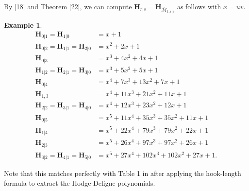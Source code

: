 \documentclass[11pt]{amsart}
\numberwithin{equation}{section}
\theoremstyle{definition}
\newtheorem{exam}[theo]{Example}
\newcommand{\bH}{\mathbf{H}}
\def\cM{{\mathcal M}}
\def\bcM{\overline{\cM}}
\begin{document}
By \eqref{18} and Theorem \ref{22}, we can compute $\bH_{r|s}=\bH_{\bcM_{1,r|s}}$ as follows with $x=uv$. 
\begin{exam}\label{23}
\begin{align*}
\bH_{0|1} = \bH_{1|0} &= x + 1 \\
\bH_{0|2} = \bH_{1|1} = \bH_{2|0} &= x^2 + 2x + 1 \\
\bH_{0|3} &= x^3 + 4x^2 + 4x + 1 \\
\bH_{1|2} = \bH_{2|1} = \bH_{3|0} &= x^3 + 5x^2 + 5x + 1 \\
\bH_{0|4} &= x^4 + 7x^3 + 13x^2 + 7x + 1 \\
\bH_{1,3} &= x^4 + 11x^3 + 21x^2 + 11x + 1 \\
\bH_{2|2} = \bH_{3|1} = \bH_{4|0} &= x^4 + 12x^3 + 23x^2 + 12x + 1 \\
\bH_{0|5} &= x^5 + 11x^4 + 35x^3 + 35x^2 + 11x + 1 \\
\bH_{1|4} &= x^5 + 22x^4 + 79x^3 + 79x^2 + 22x + 1 \\
\bH_{2|3} &= x^5 + 26x^4 + 97x^3 + 97x^2 + 26x + 1 \\
\bH_{3|2} = \bH_{4|1} = \bH_{5|0} &= x^5 + 27x^4 + 102x^3 + 102x^2 + 27x + 1.
\end{align*}
\end{exam}

Note that this matches perfectly with Table 1 in \cite{KSY} after applying the hook-length formula to extract the Hodge-Deligne polynomials.  

\medskip
\end{document}
